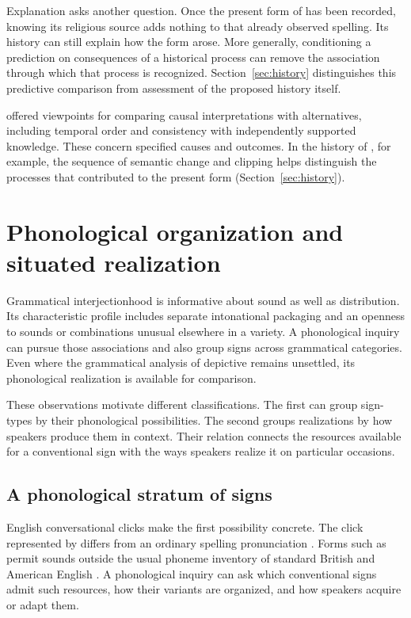 \documentclass[12pt]{article}
\begin{document}
Explanation asks another question. Once the present form of 
has been recorded, knowing its religious source adds nothing to that
already observed spelling. Its history can still explain how the form
arose. More generally, conditioning a prediction on consequences of a
historical process can remove the association through which that process
is recognized. Section~\ref{sec:history} distinguishes this predictive
comparison from assessment of the proposed history itself.

\textcite[295--299]{hill1965} offered viewpoints for comparing causal
interpretations with alternatives, including temporal order and consistency
with independently supported knowledge. These concern specified causes
and outcomes. In the history of , for example, the
sequence of semantic change and clipping helps distinguish the processes
that contributed to the present form (Section~\ref{sec:history}).

\section{Phonological organization and situated realization}\label{sec:phonology}

Grammatical interjectionhood is informative about sound as well as
distribution. Its characteristic profile includes separate intonational
packaging and an openness to sounds or combinations unusual elsewhere
in a variety. A phonological inquiry can pursue those associations
and also group signs across grammatical categories. Even where the
grammatical analysis of depictive  remains unsettled,
its phonological realization is available for comparison.

These observations motivate different classifications. The first can group
sign-types by their phonological possibilities. The second groups realizations
by how speakers produce them in context. Their relation connects
the resources available for a conventional sign with the ways speakers
realize it on particular occasions.

\subsection{A phonological stratum of signs}

English conversational clicks make the first possibility concrete. The
click represented by  differs from an ordinary spelling
pronunciation \citep[147]{wilkins1992}. Forms such as  permit
sounds outside the usual phoneme inventory of standard British and
American English \citep[74, 853]{quirk1985}. A phonological inquiry can
ask which conventional signs admit such resources, how their variants are
organized, and how speakers acquire or adapt them.
\end{document}
